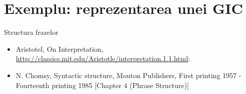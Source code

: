 \documentclass[xcolor=x11names,compress,10pt]{beamer}
\begin{document}
\section{Exemplu: reprezentarea unei GIC} \sectionframe
\begin{frame}[fragile]{Structura frazelor}
\begin{itemize}
 \item  Aristotel, On Interpretation, 
 {\small{\url{http://classics.mit.edu/Aristotle/interpretation.1.1.html}:}}
\begin{center} 
\end{center} 

 \medskip\pause
 
 \item N. Chomsy, Syntactic structure, Mouton Publishers, First printing 1957 - Fourteenth printing 1985 [Chapter 4 (Phrase Structure)]
 \medskip
\begin{center}
\end{center}
 \end{itemize}
\end{frame}
\end{document}
